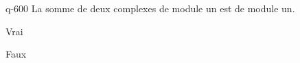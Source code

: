 \begin{truefalse}{q-600}
La somme de deux complexes de module un est de module un.
\item Vrai
\item* Faux
\end{truefalse}

